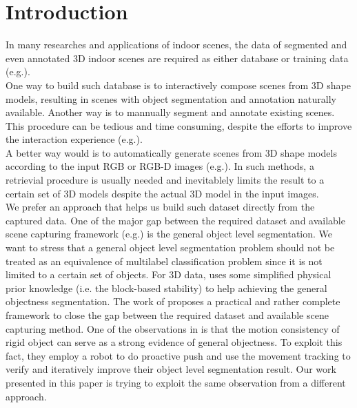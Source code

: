 \section{Introduction}
\label{sec:intro}
In many researches and applications of indoor scenes, the data of segmented and even annotated 3D indoor scenes are required as either database or training data (e.g.\cite{SearchClassify}\cite{SceneFromExample}\cite{Fisher:2012:ESO:2366145.2366154}\cite{Chen:2014:ASM:2661229.2661239}\cite{Fisher:ActivityCentricSceneSynthesis}).\\
One way to build such database is to interactively compose scenes from 3D shape models, resulting in scenes with object segmentation and annotation naturally available. Another way is to mannually segment and annotate existing scenes. This procedure can be tedious and time consuming, despite the efforts to improve the interaction experience (e.g.\cite{Merrell:2011:IFL:2010324.1964982}\cite{Xu:2013:SSC:2461912.2461968}).\\
A better way would is to automatically generate scenes from 3D shape models according to the input RGB or RGB-D images (e.g.\cite{Liu2015Model}\cite{Chen:2014:ASM:2661229.2661239}). In such methods, a retrievial procedure is usually needed and inevitablely limits the result to a certain set of 3D models despite the actual 3D model in the input images.\\
We prefer an approach that helps us build such dataset directly from the captured data. One of the major gap between the required dataset and available scene capturing framework (e.g.\cite{KinectFusion}) is the general object level segmentation. We want to stress that a general object level segmentation problem should not be treated as an equivalence of multilabel classification problem since it is not limited to a certain set of objects. For 3D data, \cite{3DReasoningfromBlockstoStability} uses some simplified physical prior knowledge (i.e. the block-based stability) to help achieving the general objectness segmentation. The work of \cite{Xu:2015:ACS:2816795.2818075} proposes a practical and rather complete framework to close the gap between the required dataset and available scene capturing method. One of the observations in \cite{Xu:2015:ACS:2816795.2818075} is that the motion consistency of rigid object can serve as a strong evidence of general objectness. To exploit this fact, they employ a robot to do proactive push and use the movement tracking to verify and iteratively improve their object level segmentation result. Our work presented in this paper is trying to exploit the same observation from a different approach.\\

